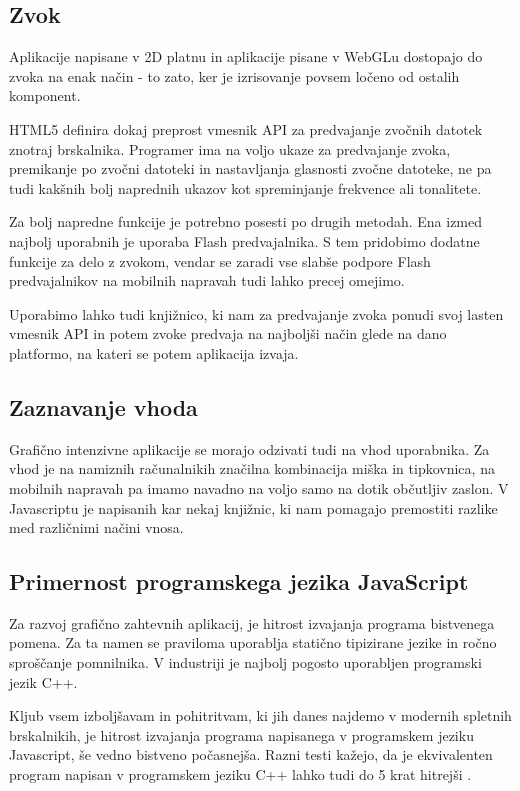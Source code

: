 \subsection{Zvok}

Aplikacije napisane v 2D platnu in aplikacije pisane v WebGLu dostopajo do zvoka na enak način - to zato, ker je izrisovanje povsem ločeno od ostalih komponent.

HTML5 definira dokaj preprost vmesnik API za predvajanje zvočnih datotek znotraj brskalnika. Programer ima na voljo ukaze za predvajanje zvoka, premikanje po zvočni datoteki in nastavljanja glasnosti zvočne datoteke, ne pa tudi kakšnih bolj naprednih ukazov kot spreminjanje frekvence ali tonalitete.

Za bolj napredne funkcije je potrebno posesti po drugih metodah. Ena izmed najbolj uporabnih je uporaba Flash predvajalnika. S tem pridobimo dodatne funkcije za delo z zvokom, vendar se zaradi vse slabše podpore Flash predvajalnikov na mobilnih napravah tudi lahko precej omejimo. 

Uporabimo lahko tudi knjižnico, ki nam za predvajanje zvoka ponudi svoj lasten vmesnik API in potem zvoke predvaja na najboljši način glede na dano platformo, na kateri se potem aplikacija izvaja.

\subsection{Zaznavanje vhoda}

Grafično intenzivne aplikacije se morajo odzivati tudi na vhod uporabnika. Za vhod je na namiznih računalnikih značilna kombinacija miška in tipkovnica, na mobilnih napravah pa imamo navadno na voljo samo na dotik občutljiv zaslon. V Javascriptu je napisanih kar nekaj knjižnic, ki nam pomagajo premostiti razlike med različnimi načini vnosa.

\subsection{Primernost programskega jezika JavaScript}

Za razvoj grafično zahtevnih aplikacij, je hitrost izvajanja programa bistvenega pomena. Za ta namen se praviloma uporablja statično tipizirane jezike in ročno sproščanje pomnilnika. V industriji je najbolj pogosto uporabljen programski jezik C++.

Kljub vsem izboljšavam in pohitritvam, ki jih danes najdemo v modernih spletnih brskalnikih, je hitrost izvajanja programa napisanega v programskem jeziku Javascript, še vedno bistveno počasnejša. Razni testi kažejo, da je ekvivalenten program napisan v programskem jeziku C++ lahko tudi do 5 krat hitrejši \cite{jsperformance}.

